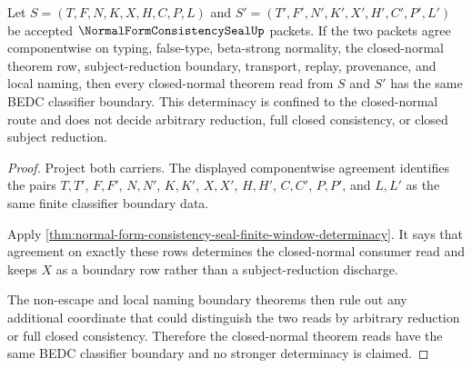 \begin{theorem}
\label{thm:normal-form-consistency-seal-reduction-determinacy}
Let $S=(T,F,N,K,X,H,C,P,L)$ and
$S'=(T',F',N',K',X',H',C',P',L')$ be accepted
$\NormalFormConsistencySealUp$ packets. If the two packets agree
componentwise on typing, false-type, beta-strong normality, the closed-normal
theorem row, subject-reduction boundary, transport, replay, provenance, and
local naming, then every closed-normal theorem read from $S$ and $S'$ has the
same BEDC classifier boundary. This determinacy is confined to the
closed-normal route and does not decide arbitrary reduction, full closed
consistency, or closed subject reduction.
\end{theorem}
\begin{proof}
Project both carriers. The displayed componentwise agreement identifies the
pairs $T,T'$, $F,F'$, $N,N'$, $K,K'$, $X,X'$, $H,H'$, $C,C'$, $P,P'$, and
$L,L'$ as the same finite classifier boundary data.

Apply
\autoref{thm:normal-form-consistency-seal-finite-window-determinacy}. It says
that agreement on exactly these rows determines the closed-normal consumer
read and keeps $X$ as a boundary row rather than a subject-reduction
discharge.

The non-escape and local naming boundary theorems then rule out any additional
coordinate that could distinguish the two reads by arbitrary reduction or full
closed consistency. Therefore the closed-normal theorem reads have the same
BEDC classifier boundary and no stronger determinacy is claimed.
\end{proof}

